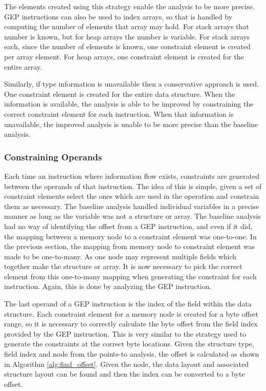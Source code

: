 \documentclass[11pt,a4paper]{article}
\begin{document}
The elements created using this strategy enable the analysis to be more precise.
GEP instructions can also be used to index arrays, so that is handled by
computing the number of elements that array may hold. For stack arrays that
number is known, but for heap arrays the number is variable. For stack arrays
each, since the number of elements is known, one constraint element is created
per array element. For heap arrays, one constraint element is created for the
entire array.

Similarly, if type information is unavailable then a conservative approach is
used. One constraint element is created for the entire data structure. When
the information is available, the analysis is able to be improved by
constraining the correct constraint element for each instruction. When that
information is unavailable, the improved analysis is unable to be more precise
than the baseline analysis.

\subsubsection{Constraining Operands}
Each time an instruction where information flow exists, constraints are
generated between the operands of that instruction. The idea of this is simple,
given a set of constraint elements select the ones which are used in the
operation and constrain them as necessary. The baseline analysis handled
individual variables in a precise manner as long as the variable was not a
structure or array. The baseline analysis had no way of identifying the offset
from a GEP instruction, and even if it did, the mapping between a memory node to
a constraint element was one-to-one. In the previous section, the mapping from
memory node to constraint element was made to be one-to-many. As one node may
represent multiple fields which together make the structure or array. It is now
necessary to pick the correct element from this one-to-many mapping when
generating the constraint for each instruction. Again, this is done by analyzing
the GEP instruction.

The last operand of a GEP instruction is the index of the field within the data
structure. Each constraint element for a memory node is created for a byte
offset range, so it is necessary to correctly calculate the byte offset from the
field index provided by the GEP instruction. This is very similar to the
strategy used to generate the constraints at the correct byte locations. Given
the structure type, field index and node from the points-to analysis, the offset
is calculated as shown in Algorithm \ref{alg:find_offset}. Given the node, the
data layout and associated structure layout can be found and then the index can
be converted to a byte offset.
\end{document}
